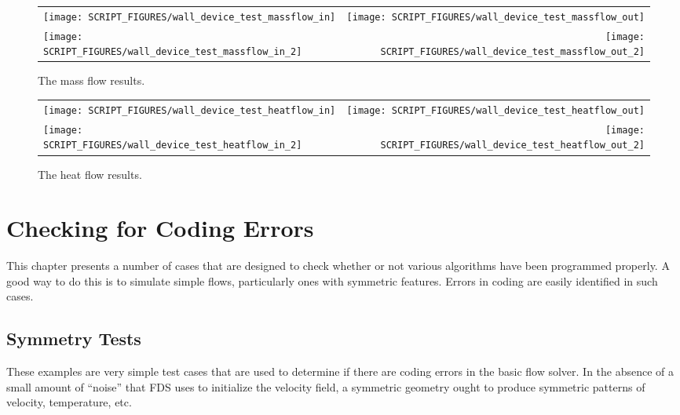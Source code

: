 \documentclass[11pt]{book}
\begin{document}
\begin{figure}[p]
\begin{tabular*}{\textwidth}{lr}
\texttt{[image: SCRIPT\_FIGURES/wall\_device\_test\_massflow\_in]} &
\texttt{[image: SCRIPT\_FIGURES/wall\_device\_test\_massflow\_out]} \\
\texttt{[image: SCRIPT\_FIGURES/wall\_device\_test\_massflow\_in\_2]} &
\texttt{[image: SCRIPT\_FIGURES/wall\_device\_test\_massflow\_out\_2]}
\end{tabular*}
\caption[The  mass flow results]{The  mass flow results.}
\label{mass_heat_wall_device_mass_flow}
\end{figure}

\begin{figure}[p]
\begin{tabular*}{\textwidth}{lr}
\texttt{[image: SCRIPT\_FIGURES/wall\_device\_test\_heatflow\_in]} &
\texttt{[image: SCRIPT\_FIGURES/wall\_device\_test\_heatflow\_out]} \\
\texttt{[image: SCRIPT\_FIGURES/wall\_device\_test\_heatflow\_in\_2]} &
\texttt{[image: SCRIPT\_FIGURES/wall\_device\_test\_heatflow\_out\_2]}
\end{tabular*}
\caption[The  heat flow results]{The  heat flow results.}
\label{mass_heat_wall_device_heat_flow}
\end{figure}


\chapter{Checking for Coding Errors}

This chapter presents a number of cases that are designed to check whether or not various algorithms have been programmed properly. A good way to do this is to simulate simple flows, particularly ones with symmetric features. Errors in coding are easily identified in such cases.

\section{Symmetry Tests}

These examples are very simple test cases that are used to determine if there are coding errors in the basic flow solver. In the absence of a small amount of ``noise'' that FDS uses to initialize the velocity field, a symmetric geometry ought to produce symmetric patterns of velocity, temperature, etc.
\end{document}
